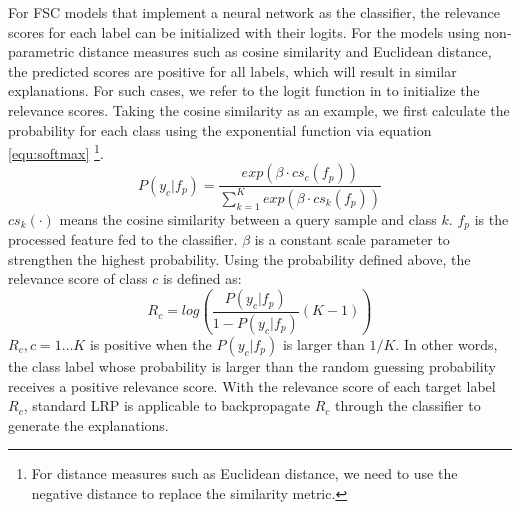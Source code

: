 \documentclass[a4paper,conference]{IEEEtran}
\begin{document}
For FSC models that implement a neural network as the classifier, the relevance scores for each label can be initialized with their logits. For the models using non-parametric distance measures such as cosine similarity and Euclidean distance, the predicted scores are positive for all labels, which will result in similar explanations.
For such cases, we refer to the logit function in \cite{Explainkmeans:kauffmann2019clustering} to initialize the relevance scores. Taking the cosine similarity as an example, we first calculate the probability for each class using the exponential function via equation \eqref{equ:softmax} \footnote{For distance measures such as Euclidean distance, we need to use the negative distance to replace the similarity metric.}.
\begin{equation}
        P(y_c|f_p) = \frac{exp(\beta \cdot cs_c(f_p))}{\sum_{k=1}^K exp(\beta \cdot cs_k(f_p))} \label{equ:softmax}
\end{equation}
$cs_k(\cdot)$ means the cosine similarity between a query sample and class $k$. $f_p$ is the processed feature fed to the classifier. $\beta$ is a constant scale parameter to strengthen the highest probability. Using the  probability defined above, the relevance score of class $c$ is defined as:
\begin{equation}
    R_c = log\left(\frac{P(y_c|f_p)}{1-P(y_c|f_p)} (K-1)\right) \label{equ:logits}
\end{equation}
$R_c,c=1\dots K$ is positive when the $P(y_c|f_p)$ is larger than $1/K$. In other words, the class label whose probability is larger than the random guessing probability receives a positive relevance score. 
With the relevance score of each target label $R_c$, standard LRP is applicable to backpropagate $R_c$ through the classifier to generate the explanations. 
\end{document}
